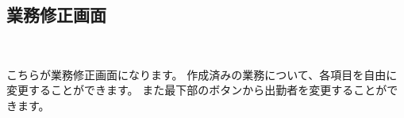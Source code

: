\documentclass[11pt, a4paper]{jarticle}
\begin{document}
	\subsection{業務修正画面}
		\begin{figure}[htbp]
			\begin{minipage}[b]{\linewidth}
				\centering
			\end{minipage} \\
			\begin{minipage}[b]{\linewidth}
				\centering
			\end{minipage}
		\end{figure}
		こちらが業務修正画面になります。
		作成済みの業務について、各項目を自由に変更することができます。
		また最下部のボタンから出勤者を変更することができます。
		\clearpage
\end{document}
